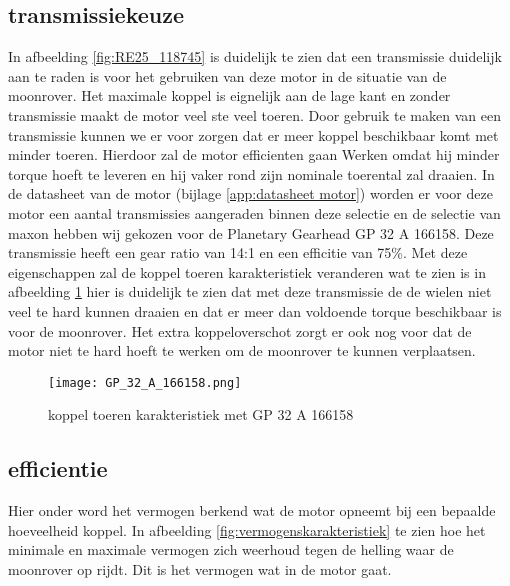 \subsection{transmissiekeuze}
In afbeelding \ref{fig:RE25_118745} is duidelijk te zien dat een transmissie duidelijk aan te raden is voor het gebruiken van deze motor in de situatie van de moonrover. Het maximale koppel is eignelijk aan de lage kant en zonder transmissie maakt de motor veel ste veel toeren. Door gebruik te maken van een transmissie kunnen we er voor zorgen dat er meer koppel beschikbaar komt met minder toeren. Hierdoor zal de motor efficienten gaan Werken omdat hij minder torque hoeft te leveren en hij vaker rond zijn nominale toerental zal draaien. In de datasheet van de  motor (bijlage \ref{app:datasheet motor}) worden er voor deze motor een aantal transmissies aangeraden binnen deze selectie en de selectie van maxon hebben wij gekozen voor de Planetary Gearhead GP 32 A 166158. Deze transmissie heeft een gear ratio van 14:1 en een efficitie van 75\%. Met deze eigenschappen zal de koppel toeren karakteristiek veranderen wat te zien is in afbeelding \ref{fig:GP 32 A 166158} hier is duidelijk te zien dat met deze transmissie de de wielen niet veel te hard kunnen draaien en dat er meer dan voldoende torque beschikbaar is voor de moonrover. Het extra koppeloverschot zorgt er ook nog voor dat de motor niet te hard hoeft te werken om de moonrover te kunnen verplaatsen.

        \begin{figure}[H]
                \centering
                \texttt{[image: GP\_32\_A\_166158.png]}
                \caption{koppel toeren karakteristiek met GP 32 A 166158}
                \label{fig:GP 32 A 166158}
        \end{figure}

\subsection{efficientie}

Hier onder word het vermogen berkend wat de motor opneemt bij een bepaalde hoeveelheid koppel. In afbeelding \ref{fig:vermogenskarakteristiek} te zien hoe het minimale en maximale vermogen zich weerhoud tegen de helling waar de moonrover op rijdt. Dit is het vermogen wat in de motor gaat.

